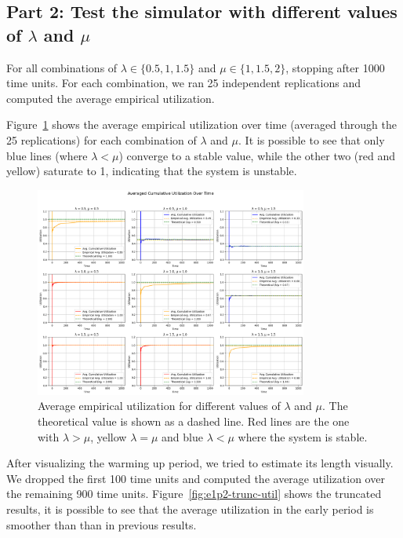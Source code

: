 \documentclass[a4paper]{article}
\begin{document}
\subsection*{Part 2: Test the simulator with different values of $\lambda$ and $\mu$}

For all combinations of $\lambda \in \{0.5, 1, 1.5\}$ and $\mu \in \{1, 1.5, 2\}$, stopping after 1000 time units.
For each combination, we ran 25 independent replications and computed the average empirical utilization.

Figure~\ref{fig:e1p2-util} shows the average empirical utilization over time (averaged through the 25 replications) for each combination of $\lambda$ and $\mu$.
It is possible to see that only blue lines (where $\lambda < \mu$) converge to a stable value, while the other two (red and yellow) saturate to 1, indicating that the system is unstable.

\begin{figure}[htbp]
  \centering
  \includegraphics[width=0.8\textwidth]{images/ex1_p2_util.png}
  \caption{
    Average empirical utilization for different values of $\lambda$ and $\mu$.
    The theoretical value is shown as a dashed line.
    Red lines are the one with $\lambda > \mu$, yellow $\lambda = \mu$ and blue $\lambda < \mu$ where the system is stable.
  }\label{fig:e1p2-util}
\end{figure}

After visualizing the warming up period, we tried to estimate its length visually. We dropped the first 100 time units and computed the average utilization over the remaining 900 time units.
Figure~\ref{fig:e1p2-trunc-util} shows the truncated results, it is possible to see that the average utilization in the early period is smoother than than in previous results.
\end{document}
